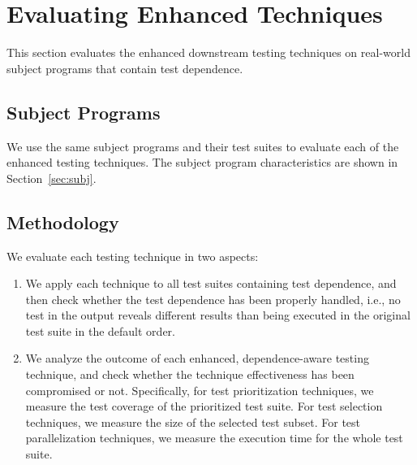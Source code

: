 
\section{Evaluating Enhanced Techniques}
\label{sec:evaluation}

This section evaluates the enhanced downstream
testing techniques on real-world subject programs
that contain test dependence.

\subsection{Subject Programs}

We use the same subject programs and their test suites
to evaluate each of the enhanced testing techniques.
The subject program characteristics are shown
in Section~\ref{sec:subj}.

\subsection{Methodology}

We evaluate each testing technique in two aspects:
\begin{enumerate}
\item We apply each technique to all test suites containing
test dependence, and then check whether the test dependence
has been properly handled, i.e., no test in the output
reveals different results than being executed in the original
test suite in the default order.
\item We analyze the outcome of each enhanced,
dependence-aware testing technique, and check whether
the technique effectiveness has been compromised or not.
Specifically, for test prioritization techniques, we measure
the test coverage of the prioritized test suite. For test
selection techniques, we measure the size of the selected
test subset. For test parallelization techniques, we measure
the execution time for the whole test suite.

\end{enumerate}


